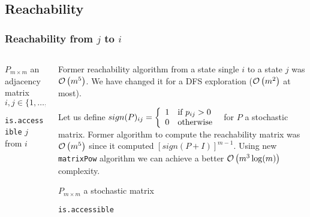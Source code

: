 \subsection{Reachability}
 \begin{frame}\frametitle{Reachability from $j$ to $i$}
    \vspace{2.5em}
    \begin{columns}
    \begin{column}{0.5\textwidth}
        
        \begin{algorithm}[H]
        \begin{algorithmic}[1]
        \REQUIRE $P_{m \times m}$ an adjacency matrix
        \REQUIRE $i,j \in \{1, \ldots, m\}$
        \NEWLINE
            \ENDIF
            \ENDFOR
        \ENDWHILE
        \end{algorithmic}
        \caption{\small\texttt{is.accessible} $j$ from $i$}
        \label{alg:is.accessible.i.j}
        \end{algorithm}
    \end{column}
    \begin{column}{0.5\textwidth}
        Former reachability algorithm from a state single \(i\) to a state \(j\) 
        was \(\mathcal{O}\left(m^5\right)\). We have  changed it for a DFS exploration
        (\(\mathcal{O}\left(m^2\right)\) at most).
        
        Let us define \(sign(P)_{ij} = \left\{\begin{array}{ll} 1 & \textrm{if } p_{ij} > 0 \\ 0 & \textrm{otherwise } \end{array}\right.\) for \(P\) a 
        stochastic matrix. Former algorithm to compute the reachability matrix 
        was \(\mathcal{O}\left(m^5\right)\) since it computed \(\left[sign(P + I)\right]^{m - 1}\). 
        Using  new \small\texttt{matrixPow} algorithm we can achieve a better 
        \(\mathcal{O}\left(m^3 \log(m)\right)\) complexity.
        
        \vspace{-1em}
        \begin{algorithm}[H]
        \begin{algorithmic}[1]
        \REQUIRE $P_{m \times m}$ a stochastic matrix
        \NEWLINE
        \end{algorithmic}
        \caption{\small\texttt{is.accessible}}
        \label{alg:is.accessible}
        \end{algorithm}
    \end{column}
    \end{columns}
\end{frame}

